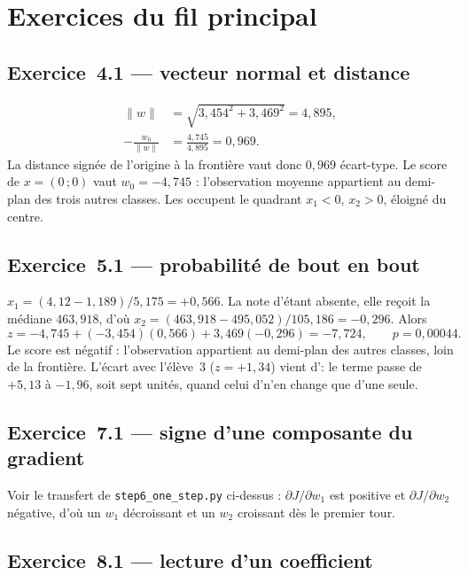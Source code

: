 \section{Exercices du fil principal}

\subsection*{Exercice~4.1 --- vecteur normal et distance}

\begin{align*}
\|w\| &= \sqrt{3{,}454^2+3{,}469^2}=4{,}895,\\
-\frac{w_0}{\|w\|} &= \frac{4{,}745}{4{,}895}=0{,}969.
\end{align*}
La distance signée de l'origine à la frontière vaut donc $0{,}969$ écart-type.
Le score de $x=(0\,;0)$ vaut $w_0=-4{,}745$ : l'observation moyenne appartient
au demi-plan des trois autres classes. Les \Gryf occupent le quadrant
$x_1<0$, $x_2>0$, éloigné du centre.

\subsection*{Exercice~5.1 --- probabilité de bout en bout}

$x_1=(4{,}12-1{,}189)/5{,}175=+0{,}566$. La note d'\Runes étant absente, elle
reçoit la médiane $463{,}918$, d'où
$x_2=(463{,}918-495{,}052)/105{,}186=-0{,}296$. Alors
\[
  z=-4{,}745+(-3{,}454)(0{,}566)+3{,}469(-0{,}296)=-7{,}724,
  \qquad p=0{,}00044 .
\]
Le score est négatif : l'observation appartient au demi-plan des autres classes,
loin de la frontière. L'écart avec l'élève~$3$ ($z=+1{,}34$) vient d'\Herb : le terme
passe de $+5{,}13$ à $-1{,}96$, soit sept unités, quand celui d'\Runes n'en
change que d'une seule.

\subsection*{Exercice~7.1 --- signe d'une composante du gradient}

Voir le transfert de \texttt{step6\_one\_step.py} ci-dessus : $\partial
J/\partial w_1$ est positive et $\partial J/\partial w_2$ négative, d'où un $w_1$
décroissant et un $w_2$ croissant dès le premier tour.

\subsection*{Exercice~8.1 --- lecture d'un coefficient}

